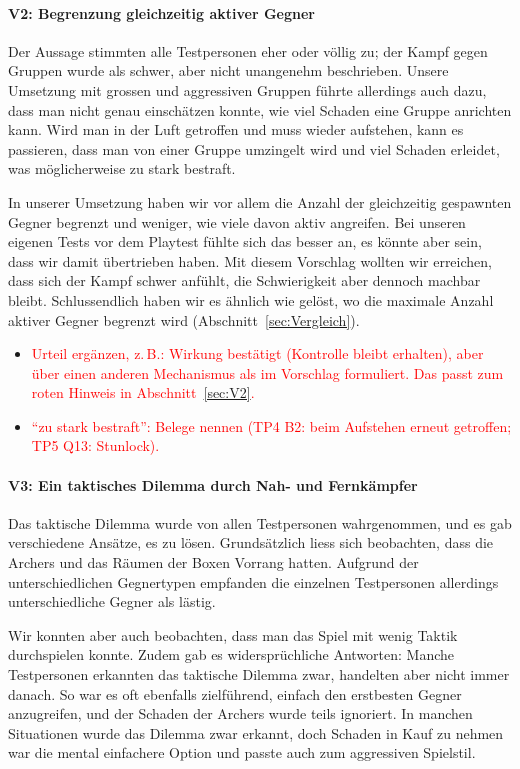 \documentclass[../Main.tex]{subfiles}
\begin{document}
\paragraph{V2: Begrenzung gleichzeitig aktiver Gegner}
Der Aussage stimmten alle Testpersonen eher oder völlig zu; der Kampf gegen Gruppen wurde als schwer, aber nicht unangenehm beschrieben. Unsere Umsetzung mit grossen und aggressiven Gruppen führte allerdings auch dazu, dass man nicht genau einschätzen konnte, wie viel Schaden eine Gruppe anrichten kann. Wird man in der Luft getroffen und muss wieder aufstehen, kann es passieren, dass man von einer Gruppe umzingelt wird und viel Schaden erleidet, was möglicherweise zu stark bestraft.

In unserer Umsetzung haben wir vor allem die Anzahl der gleichzeitig gespawnten Gegner begrenzt und weniger, wie viele davon aktiv angreifen. Bei unseren eigenen Tests vor dem Playtest fühlte sich das besser an, es könnte aber sein, dass wir damit übertrieben haben. Mit diesem Vorschlag wollten wir erreichen, dass sich der Kampf schwer anfühlt, die Schwierigkeit aber dennoch machbar bleibt. Schlussendlich haben wir es ähnlich wie  gelöst, wo die maximale Anzahl aktiver Gegner begrenzt wird (Abschnitt~\ref{sec:Vergleich}).

\begin{itemize}[leftmargin=1.5cm]
    \item \textcolor{red}{Urteil ergänzen, z.\,B.: Wirkung bestätigt (Kontrolle bleibt erhalten), aber über einen anderen Mechanismus als im Vorschlag formuliert. Das passt zum roten Hinweis in Abschnitt~\ref{sec:V2}.}
    \item \textcolor{red}{\enquote{zu stark bestraft}: Belege nennen (TP4 B2: beim Aufstehen erneut getroffen; TP5 Q13: Stunlock).}
\end{itemize}

\paragraph{V3: Ein taktisches Dilemma durch Nah- und Fernkämpfer}
Das taktische Dilemma wurde von allen Testpersonen wahrgenommen, und es gab verschiedene Ansätze, es zu lösen. Grundsätzlich liess sich beobachten, dass die Archers und das Räumen der Boxen Vorrang hatten. Aufgrund der unterschiedlichen Gegnertypen empfanden die einzelnen Testpersonen allerdings unterschiedliche Gegner als lästig.

Wir konnten aber auch beobachten, dass man das Spiel mit wenig Taktik durchspielen konnte. Zudem gab es widersprüchliche Antworten: Manche Testpersonen erkannten das taktische Dilemma zwar, handelten aber nicht immer danach. So war es oft ebenfalls zielführend, einfach den erstbesten Gegner anzugreifen, und der Schaden der Archers wurde teils ignoriert. In manchen Situationen wurde das Dilemma zwar erkannt, doch Schaden in Kauf zu nehmen war die mental einfachere Option und passte auch zum aggressiven Spielstil.
\end{document}
